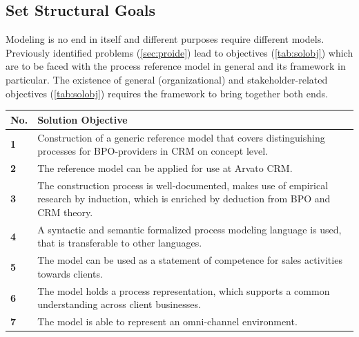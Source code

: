 	\subsection{Set Structural Goals}
	
	Modeling is no end in itself and different purposes require different models. Previously identified problems (\ref{sec:proide}) lead to objectives (\ref{tab:solobj}) which are to be faced with the process reference model in general and its framework in particular. The existence of general (organizational) and stakeholder-related objectives (\cf \Tab \ref{tab:solobj}) requires the framework to bring together both ends.
	
	\begin{table}[caption={Solution Objectives}, label={tab:solobj}]
		\centering
		\begin{tabular}{l p{13.3cm}}

			\textbf{No. }&\textbf{ Solution Objective}
			 \\ \hline
			\textbf{1 }                        & Construction of a generic reference model that covers distinguishing processes for BPO-providers in CRM on concept level.                                                    \\ \hline
			\textbf{2}                         & The reference model can be applied for use at Arvato CRM.                                                                                                                    \\ \hline
			\textbf{3 }                        & The construction process is well-documented, makes use of empirical research by induction, which is enriched by deduction from \acrshort{BPO} and \acrshort{CRM} theory. \\ \hline
			\textbf{4}                         & A syntactic and semantic formalized process modeling language is used, that is transferable to other languages.                                                              \\ \hline
			\textbf{5}                         & The model can be used as a statement of competence for sales activities towards clients.                                                                                     \\ \hline
			\textbf{6}                         & The model holds a process representation, which supports a common understanding across client businesses.                                                                    \\ \hline
			\textbf{7}                         & The model is able to represent an omni-channel environment.                                                                                                                 
		\end{tabular}
	\end{table}

